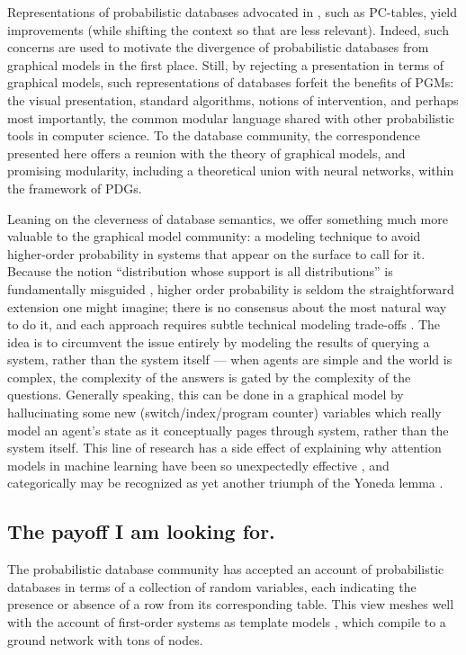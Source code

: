 \documentclass{article}
\theoremstyle{plain}
\theoremstyle{definition}
\theoremstyle{remark}
\begin{document}
Representations of probabilistic databases advocated in \cite{suciu2011probabilistic}, such as PC-tables, yield improvements  (while shifting the context so that  are less relevant). Indeed, such concerns are used to motivate the divergence of probabilistic databases from graphical models in the first place. Still, by rejecting a presentation in terms of graphical models, such representations of databases forfeit the benefits of PGMs: the visual presentation, standard algorithms, notions of intervention, and perhaps most importantly, the common modular language shared with other probabilistic tools in computer science.
To the database community, the correspondence presented here offers a reunion with the theory of graphical models, and promising modularity, including a theoretical union with neural networks, within the framework of PDGs. 


Leaning on the cleverness of database semantics, we offer something much more valuable to the graphical model community: a modeling technique to avoid higher-order probability in systems that appear on the surface to call for it. Because the notion ``distribution whose support is all distributions'' is fundamentally misguided \cite{}, higher order probability is seldom the straightforward extension one might imagine; there is no consensus about the most natural way to do it, and each approach requires subtle technical modeling trade-offs \cite{}. The idea is to circumvent the issue entirely by modeling the results of querying a system, rather than the system itself --- when agents are simple and the world is complex, the complexity of the answers is gated by the complexity of the questions. Generally speaking, this can be done in a graphical model by hallucinating some new (switch/index/program counter) variables which really model an agent's state as it conceptually pages through system, rather than the system itself. This line of research has a side effect of explaining why attention models in machine learning have been so unexpectedly effective \cite{}, and categorically may be recognized as yet another triumph of the Yoneda lemma \cite{}.

\clearpage
\subsection*{The payoff I am looking for.}

The probabilistic database community has accepted an account of probabilistic databases in terms of a collection of random variables, each indicating the presence or absence of a row from its corresponding table. This view meshes well with the account of first-order systems as template models \cite[chapter 6]{KF09}, which compile to a ground network with tons of nodes.
\end{document}
